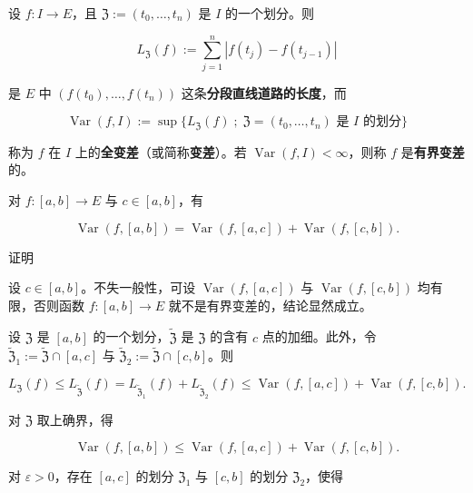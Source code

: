 设 $ f : I \to E $，且 $ \mathfrak{Z} := (t_0,\ldots,t_n) $ 是 $ I $ 的一个划分。则

\[
L_{\mathfrak{Z}}(f) := \sum_{j=1}^{n}|f(t_j) - f(t_{j-1})|
\]

是 $ E $ 中 $ (f(t_0),\ldots,f(t_n)) $ 这条\textbf{分段直线道路的长度}，而

\[
\operatorname{Var}(f,I) := \sup\{ L_{\mathfrak{Z}}(f) \;;\; \mathfrak{Z} = (t_0,\ldots,t_n) \text{ 是 } I \text{ 的划分} \}
\]

称为 $ f $ 在 $ I $ 上的\textbf{全变差}（或简称\textbf{变差}）。若 $ \operatorname{Var}(f,I) < \infty $，则称 $ f $ 是\textbf{有界变差}的。


\begin{lemma}

对 $ f : [a,b] \to E $ 与 $ c \in [a,b] $，有

\begin{equation}
\operatorname{Var}(f,[a,b]) = \operatorname{Var}(f,[a,c]) + \operatorname{Var}(f,[c,b]) .\tag{1.1}
\end{equation}

证明

\begin{subitems}
\item

设 $ c \in [a,b] $。不失一般性，可设 $ \operatorname{Var}(f,[a,c]) $ 与 $ \operatorname{Var}(f,[c,b]) $ 均有限，否则函数 $ f : [a,b] \to E $ 就不是有界变差的，结论显然成立。

\item

设 $ \mathfrak{Z} $ 是 $ [a,b] $ 的一个划分，$ \tilde{\mathfrak{Z}} $ 是 $ \mathfrak{Z} $ 的含有 $ c $ 点的加细。此外，令 $ \tilde{\mathfrak{Z}}_1 := \tilde{\mathfrak{Z}} \cap [a,c] $ 与 $ \tilde{\mathfrak{Z}}_2 := \tilde{\mathfrak{Z}} \cap [c,b] $。则

\[
L_{\mathfrak{Z}}(f) \le L_{\tilde{\mathfrak{Z}}}(f) = L_{\tilde{\mathfrak{Z}}_1}(f) + L_{\tilde{\mathfrak{Z}}_2}(f) \le \operatorname{Var}(f,[a,c]) + \operatorname{Var}(f,[c,b]) .
\]

对 $ \mathfrak{Z} $ 取上确界，得

\[
\operatorname{Var}(f,[a,b]) \le \operatorname{Var}(f,[a,c]) + \operatorname{Var}(f,[c,b]) .
\]
\item

对 $ \varepsilon > 0 $，存在 $ [a,c] $ 的划分 $ \mathfrak{Z}_1 $ 与 $ [c,b] $ 的划分 $ \mathfrak{Z}_2 $，使得


\end{subitems}
\end{lemma}
